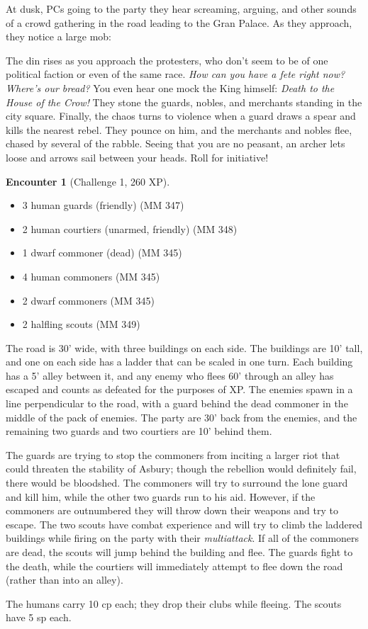 \documentclass{report}
\theoremstyle{definition}
\newtheorem{enc}{Encounter}[chapter]
\begin{document}
At dusk, PCs going to the party they hear screaming, arguing, and other sounds of a crowd gathering in the road leading to the Gran Palace. As they approach, they notice a large mob:
\begin{displayquote}
The din rises as you approach the protesters, who don't seem to be of one political faction or even of the same race.  \textit{How can you have a fete right now? Where's our bread?}  You even hear one mock the King himself:  \textit{Death to the House of the Crow!}  They stone the guards, nobles, and merchants standing in the city square.   Finally, the chaos turns to violence when a guard draws a spear and kills the nearest rebel.  They pounce on him, and the merchants and nobles flee, chased by several of the rabble.  Seeing that you are no peasant, an archer lets loose and arrows sail between your heads. Roll for initiative!
\end{displayquote}
\begin{enc}[Challenge 1, 260 XP]

\leavevmode
\begin{itemize}
\item 3 human guards (friendly) (MM 347)
\item 2 human courtiers (unarmed, friendly) (MM 348)
\item 1 dwarf commoner (dead) (MM 345)
\item 4 human commoners (MM 345)
\item 2 dwarf commoners (MM 345)
\item 2 halfling scouts (MM 349)
\end{itemize}

The road is 30' wide, with three buildings on each side. The buildings are 10' tall, and one on each side has a ladder that can be scaled in one turn. Each building has a 5' alley between it, and any enemy who flees 60' through an alley has escaped and counts as defeated for the purposes of XP. The enemies spawn in a line perpendicular to the road, with a guard behind the dead commoner in the middle of the pack of enemies. The party are 30' back from the enemies, and the remaining two guards and two courtiers are 10' behind them.

The guards are trying to stop the commoners from inciting a larger riot that could threaten the stability of Asbury; though the rebellion would definitely fail, there would be bloodshed.  The commoners will try to surround the lone guard and kill him, while the other two guards run to his aid. However, if the commoners are outnumbered they will throw down their weapons and try to escape. The two scouts have combat experience and will try to climb the laddered buildings while firing on the party with their \textit{multiattack}. If all of the commoners are dead, the scouts will jump behind the building and flee. The guards fight to the death, while the courtiers will immediately attempt to flee down the road (rather than into an alley).

The humans carry 10 cp each; they drop their clubs while fleeing.  The scouts have 5 sp each.
\end{enc}
\end{document}

